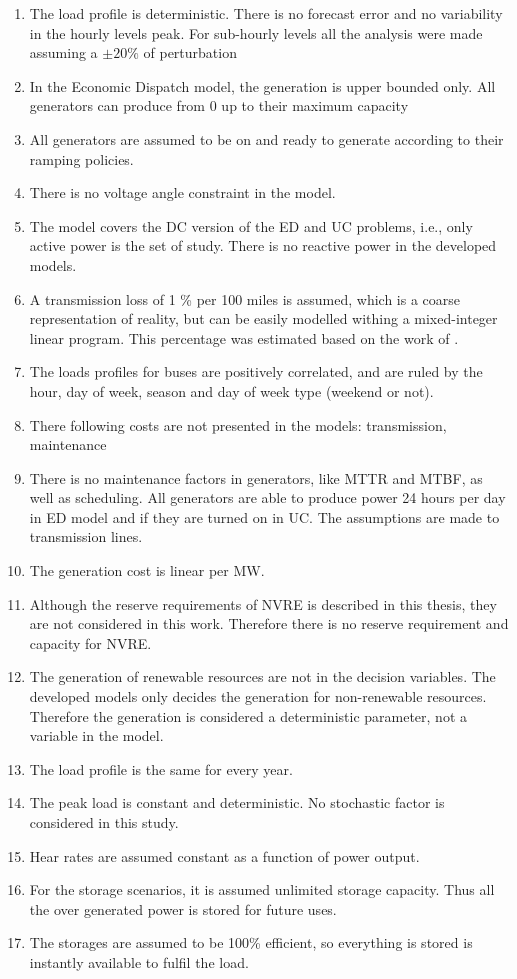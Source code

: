 \documentclass[12pt,LUDisStyle,twosided]{book}
\begin{document}
\begin{enumerate}
\item The load profile is deterministic. There is no forecast error and no variability in the hourly levels peak. For sub-hourly levels all the analysis were made assuming a $\pm20\%$ of perturbation
\item In the Economic Dispatch model, the generation is upper bounded only. All generators can produce from 0 up to their maximum capacity
\item All generators are assumed to be on and ready to generate according to their ramping policies.
\item There is no voltage angle constraint in the model.
\item The model covers the DC version of the ED and UC problems, i.e., only active power is the set of study. There is no reactive power in the developed models.
\item A transmission loss of 1 \% per 100 miles is assumed, which is a coarse representation of reality, but can be easily modelled withing a mixed-integer linear program. This percentage was estimated based on the work of \citeauthor{short} \cite{short}.
\item The loads profiles for buses are positively correlated, and are ruled by the hour, day of week, season and day of week type (weekend or not).
\item There following costs are not presented in the models: transmission, maintenance
\item There is no maintenance factors in generators, like MTTR and MTBF, as well as scheduling. All generators are able to produce power 24 hours per day in ED model and if they are turned on in UC. The assumptions are made to transmission lines.
\item The generation cost is linear per MW.
\item Although the reserve requirements of NVRE is described in this thesis, they are not considered in this work. Therefore there is no reserve requirement and capacity for NVRE.
\item The generation of renewable resources are not in the decision variables. The developed models only decides the generation for non-renewable resources. Therefore the generation is considered a deterministic parameter, not a variable in the model.
\item The load profile is the same for every year.
\item The peak load is constant and deterministic. No stochastic factor is considered in this study.
\item Hear rates are assumed constant as a function of power output.
\item For the storage scenarios, it is assumed unlimited storage capacity. Thus all the over generated power is stored for future uses.
\item The storages are assumed to be 100\% efficient, so everything is stored is instantly available to fulfil the load.
\end{enumerate}
\end{document}
